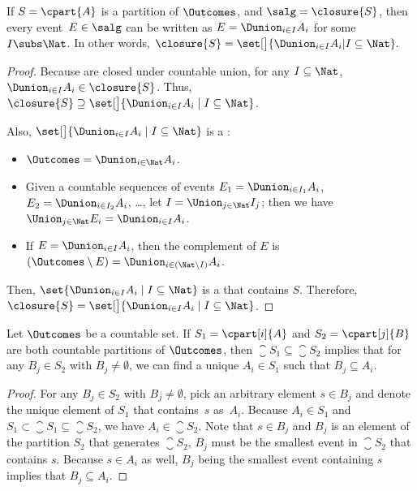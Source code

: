 \begin{lemma}
\label{lemma:sigma-alg-representation}
  If $S = \cpart{A}$ is a partition of $\Outcomes$,
  and $\salg = \closure{S}$,
  then every event~$E\in\salg$ can be written as
  $E = \Dunion_{i \in I} A_i$ for some $I \subs \Nat$.
In other words,
  $
    \closure{S} = \set[\big]{ \Dunion_{i \in I} A_i | I \subseteq \Nat }.
  $
\end{lemma}

\begin{proof}
  Because \salgebra[s] are closed under countable union,
  for any $I \subseteq \Nat$,
  $ \Dunion_{i \in I} A_i \in \closure{S} $.
  Thus, $\closure{S} \supseteq \set[\big]{ \Dunion_{i \in I} A_i \mid I \subseteq \Nat }$.

  Also, $\set[\big]{ \Dunion_{i \in I} A_i \mid I \subseteq \Nat }$ is
  a \salgebra{}:
\begin{itemize}
    \item
      $\Outcomes = \Dunion_{i \in \Nat} A_i$.
    \item
      Given a countable sequences of events
      $E_1 = \Dunion_{i \in I_1} A_i$,
      $E_2 = \Dunion_{i \in I_2} A_i$,
      \dots,
      let
      $I = \Union_{j\in \Nat} I_j$;
      then we have
      $ \Union_{j\in\Nat} E_i = \Dunion_{i\in I} A_i $.
    \item
      If $E = \Dunion_{i \in I} A_i$, then
      the complement of $E$ is
      $
        (\Outcomes\setminus E) = \Dunion_{i \in (\Nat \setminus I)} A_i
      $.
  \end{itemize}
  Then, $\set{ \Dunion_{i \in I} A_i \mid I \subseteq \Nat }$ is
  a \salgebra{} that contains $S$.
  Therefore, $
    \closure{S} = \set[\big]{\Dunion_{i \in I} A_i \mid I \subseteq \Nat }
  $.
\end{proof}

\begin{lemma}
 \label{lemma:partition-order}
 Let $\Outcomes$ be a countable set.
 If\/ $S_1 = \cpart[i]{A}$ and
    $S_2 = \cpart[j]{B}$ are both countable partitions of $\Outcomes$,
 then $\closure{S_1} \subseteq \closure{S_2}$ implies that
 for any $B_j \in S_2$ with $B_j\ne \emptyset$,
 we can find a unique $A_i \in S_1$ such that $B_j \subseteq A_i$.
\end{lemma}

\begin{proof}
 For any $B_j \in S_2$ with $B_j\ne \emptyset$,
 pick an arbitrary element $s \in B_j$ and
 denote the unique element of $S_1$ that contains~$s$ as~$A_i$.
 Because $A_i \in S_1$ and $S_1 \subset  \closure{S_1} \subseteq \closure{S_2}$,  we have $A_i \in  \closure{S_2}$.
Note that $s \in B_j$ and $B_j$ is an element of the partition $S_2$
  that generates $\closure{S_2}$, $B_j$ must be the smallest event
  in $\closure{S_2}$ that contains $s$.
 Because $s \in A_i$ as well, $B_j$ being the smallest event containing $s$
  implies that $B_j \subseteq A_i$.
\end{proof}

